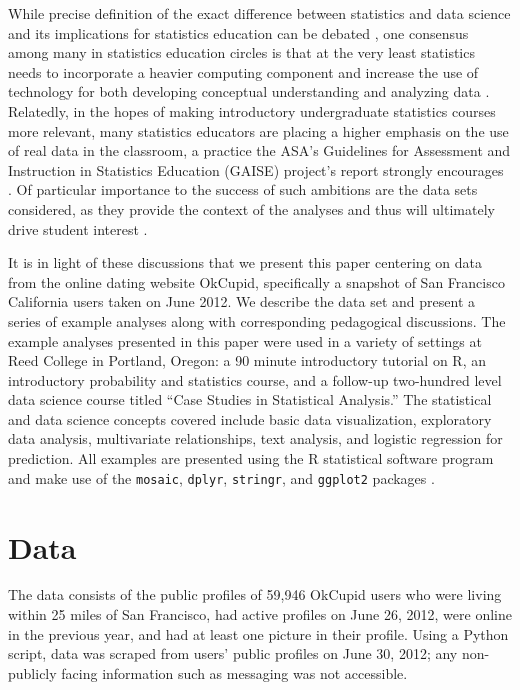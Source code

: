 \documentclass{article}
\begin{document}
While precise definition of the exact difference between statistics and data science and its implications for statistics education can be debated \citep{WICKHAM:2014}, one consensus among many in statistics education circles is that at the very least statistics needs to incorporate a heavier computing component and increase the use of technology for both developing conceptual understanding and analyzing data \citep{GAISE:05, NOLAN:LANG:2010}.  Relatedly, in the hopes of making introductory undergraduate statistics courses more relevant, many statistics educators are placing a higher emphasis on the use of real data in the classroom, a practice the ASA's Guidelines for Assessment and Instruction in Statistics Education (GAISE) project's report strongly encourages \citep{GAISE:05}.  Of particular importance to the success of such ambitions are the data sets considered, as they provide the context of the analyses and thus will ultimately drive student interest \citep{GOULD:2010}.

It is in light of these discussions that we present this paper centering on data from the online dating website OkCupid, specifically a snapshot of San Francisco California users taken on June 2012.  We describe the data set and present a series of example analyses along with corresponding pedagogical discussions.  The example analyses presented in this paper were used in a variety of settings at Reed College in Portland, Oregon: a 90 minute introductory tutorial on R, an introductory probability and statistics course, and a follow-up two-hundred level data science course titled ``Case Studies in Statistical Analysis.''  The statistical and data science concepts covered include basic data visualization, exploratory data analysis, multivariate relationships, text analysis, and logistic regression for prediction.  All examples are presented using the R statistical software program and make use of the \verb#mosaic#, \verb#dplyr#, \verb#stringr#, and \verb#ggplot2# packages \citep{mosaic, ggplot2, stringr, dplyr}.








%
\section{Data}
%
The data consists of the public profiles of 59,946 OkCupid users who were living within 25 miles of San Francisco, had active profiles on June 26, 2012, were online in the previous year, and had at least one picture in their profile.  Using a Python script, data was scraped from users' public profiles on June 30, 2012; any non-publicly facing information such as messaging was not accessible.
\end{document}
